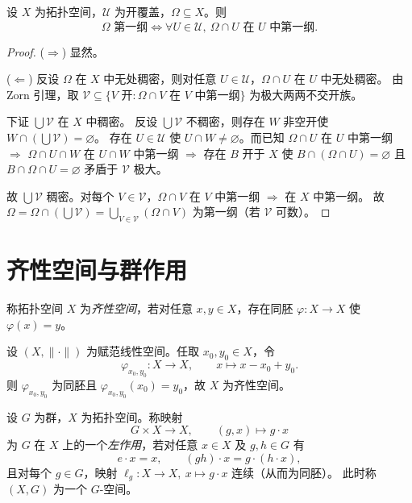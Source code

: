 \documentclass[lang=cn,a4paper,newtx,figureplace=section,tableplace=section]{elegantbook}
\begin{document}
\begin{lemma}\label{lem:first-category-open-cover}
  设 $X$ 为拓扑空间，$\mathcal U$ 为开覆盖，$\Omega\subseteq X$。则
  \[
    \Omega\text{ 第一纲}\Leftrightarrow\forall U\in\mathcal U,\ \Omega\cap U\text{ 在 }U\text{ 中第一纲}.
  \]
\end{lemma}
\begin{proof}
  ($\Rightarrow$) 显然。

  ($\Leftarrow$) 反设 $\Omega$ 在 $X$ 中无处稠密，则对任意 $U\in\mathcal U$，$\Omega\cap U$ 在 $U$ 中无处稠密。
  由 Zorn 引理，取 $\mathcal V\subseteq\{V\text{ 开}:\Omega\cap V\text{ 在 }V\text{ 中第一纲}\}$ 为极大两两不交开族。

  下证 $\bigcup\mathcal V$ 在 $X$ 中稠密。
  反设 $\bigcup\mathcal V$ 不稠密，则存在 $W$ 非空开使 $W\cap(\bigcup\mathcal V)=\varnothing$。
  存在 $U\in\mathcal U$ 使 $U\cap W\neq\varnothing$。而已知 $\Omega\cap U$ 在 $U$ 中第一纲 $\Rightarrow$ $\Omega\cap U\cap W$ 在 $U\cap W$ 中第一纲 $\Rightarrow$ 存在 $B$ 开于 $X$ 使 $B\cap(\Omega\cap U)=\varnothing$ 且 $B\cap\Omega\cap U=\varnothing$ 矛盾于 $\mathcal V$ 极大。

  故 $\bigcup\mathcal V$ 稠密。对每个 $V\in\mathcal V$，$\Omega\cap V$ 在 $V$ 中第一纲 $\Rightarrow$ 在 $X$ 中第一纲。
  故 $\Omega=\Omega\cap(\bigcup\mathcal V)=\bigcup_{V\in\mathcal V}(\Omega\cap V)$ 为第一纲（若 $\mathcal V$ 可数）。
\end{proof}


\section{齐性空间与群作用}

\begin{definition}[齐性空间]\label{def:homogeneous-space}
  称拓扑空间 $X$ 为\emph{齐性空间}，若对任意 $x,y\in X$，存在同胚 $\varphi:X\to X$ 使 $\varphi(x)=y$。
\end{definition}

\begin{example}\label{ex:normed-space-homogeneous}
  设 $(X,\|\cdot\|)$ 为赋范线性空间。任取 $x_0,y_0\in X$，令
  \[
    \varphi_{x_0,y_0}:X\to X,\qquad x\mapsto x-x_0+y_0.
  \]
  则 $\varphi_{x_0,y_0}$ 为同胚且 $\varphi_{x_0,y_0}(x_0)=y_0$，故 $X$ 为齐性空间。
\end{example}

\begin{definition}[群作用与 $G$-空间]\label{def:g-space}
  设 $G$ 为群，$X$ 为拓扑空间。称映射
  \[
    G\times X\to X,\qquad (g,x)\mapsto g\cdot x
  \]
  为 $G$ 在 $X$ 上的一个\emph{左作用}，若对任意 $x\in X$ 及 $g,h\in G$ 有
  \[
    e\cdot x=x,\qquad (gh)\cdot x=g\cdot(h\cdot x),
  \]
  且对每个 $g\in G$，映射 $\ell_g:X\to X,\ x\mapsto g\cdot x$ 连续（从而为同胚）。
  此时称 $(X,G)$ 为一个 $G$-空间。
\end{definition}
\end{document}
